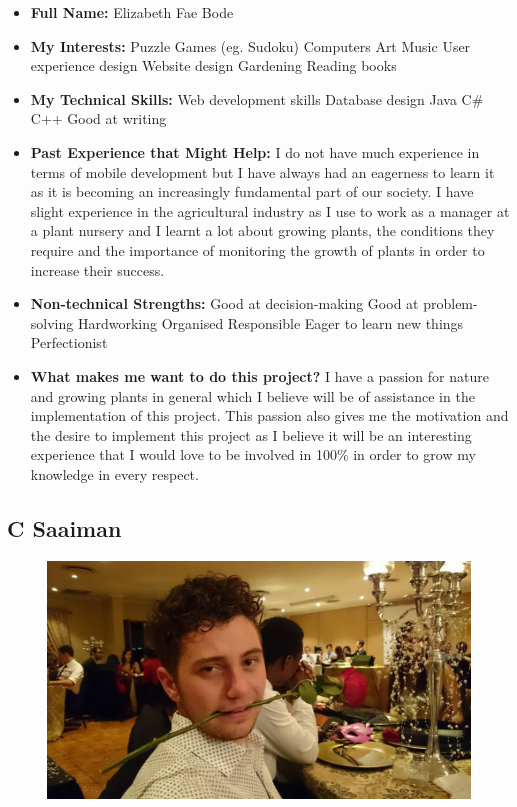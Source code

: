 \documentclass{article}
\begin{document}
	\begin{itemize}
		\item \textbf{Full Name:} Elizabeth Fae Bode
		\item \textbf{My Interests:}
		\subitem Puzzle Games (eg. Sudoku)
		\subitem Computers
		\subitem Art
		\subitem Music
		\subitem User experience design
		\subitem Website design
		\subitem Gardening
		\subitem Reading books
		
		\item \textbf{My Technical Skills:}
		\subitem Web development skills
		\subitem Database design
		\subitem Java
		\subitem C\#
		\subitem C++
		\subitem Good at writing
		
		\item \textbf{Past Experience that Might Help:} \newline
		I do not have much experience in terms of mobile development but I have always had an eagerness to learn it as it is becoming an increasingly fundamental part of our society. I have slight experience in the agricultural industry as I use to work as a manager at a plant nursery and I learnt a lot about growing plants, the conditions they require and the importance of monitoring the growth of plants in order to increase their success.
		
		\item \textbf{Non-technical Strengths:}
		\subitem Good at decision-making
		\subitem Good at problem-solving
		\subitem Hardworking
		\subitem Organised
		\subitem Responsible
		\subitem Eager to learn new things
		\subitem Perfectionist
		
		\item \textbf{What makes me want to do this project?} \newline
		I have a passion for nature and growing plants in general which I believe will be of assistance in the implementation of this project. This passion also gives me the motivation and the desire to implement this project as I believe it will be an interesting experience that I would love to be involved in 100\% in order to grow my knowledge in every respect.
	\end{itemize}

		\subsection{C Saaiman}
	\begin{figure}[h]
		\centering
		\includegraphics[height=0.3\textheight]{../Saaiman.jpg}
	\end{figure}
    
\end{document}
